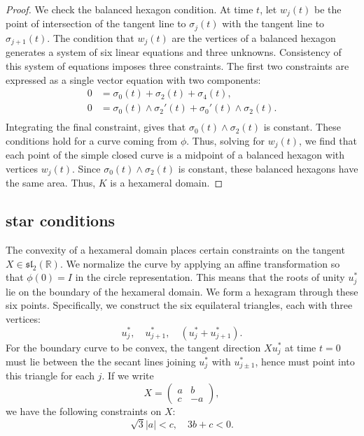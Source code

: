 \documentclass[11pt]{amsart}
\newcommand{\ring}[1]{\mathbb{#1}}
\begin{document}
\begin{proof} 
  We check the balanced hexagon condition.  At time $t$, let $w_j(t)$
  be the point of intersection of the tangent line to $\sigma_j(t)$
  with the tangent line to $\sigma_{j+1}(t)$.  The condition that
  $w_j(t)$ are the vertices of a balanced hexagon generates a system
  of six linear equations and three unknowns.  Consistency of this
  system of equations imposes three constraints.  The first two
constraints are expressed as a single 
vector equation with two components:
   \[
   \begin{array}{lll}
   0 &= \sigma_0(t) + \sigma_2(t) + \sigma_4(t),\\
   0 &= {\sigma_0(t)}\land{\sigma_2'(t)}+ {\sigma_0'(t)}\land{\sigma_2(t)}.\\
   \end{array}
   \]
   Integrating the final constraint, gives that
   ${\sigma_0(t)}\land{\sigma_2(t)}$ is constant.  These conditions
   hold for a curve coming from $\phi$.  Thus, solving for $w_j(t)$,
   we find that each point of the simple closed curve is a midpoint of
   a balanced hexagon with vertices $w _j(t)$.  Since
   ${\sigma_0(t)}\land{\sigma_2(t)}$ is constant, these balanced
   hexagons have the same area.  Thus, $K$ is a hexameral domain.
\end{proof}

\subsection{star conditions}\label{sec:star}

The convexity of a hexameral domain places certain constraints on the
tangent $X\in\mathfrak{sl}_2(\ring{R})$.  We normalize the curve by
applying an affine transformation so that $\phi(0)=I$ in the circle
representation.  This means that the roots of unity $u^*_j$ lie on the
boundary of the hexameral domain.  We form a hexagram through these
six points.  Specifically, we construct the six equilateral triangles,
each with three vertices:
\[
   u^*_j,\quad u^*_{j+1},\quad (u^*_j + u^*_{j+1}).
\]
For the boundary curve to be convex, the tangent direction $X u^*_j$
at time $t=0$ must lie between the the secant lines joining $u^*_j$
with $u^*_{j\pm 1}$, hence must point into this triangle for each $j$.
If we write
\[
X  = \left(\begin{matrix} a & b \\ c & -a \end{matrix}\right),
\]
we have the following constraints on $X$:
\begin{equation}\label{eqn:star}
\sqrt{3} |a| < c,\quad 3 b + c < 0.
\end{equation}
\end{document}
